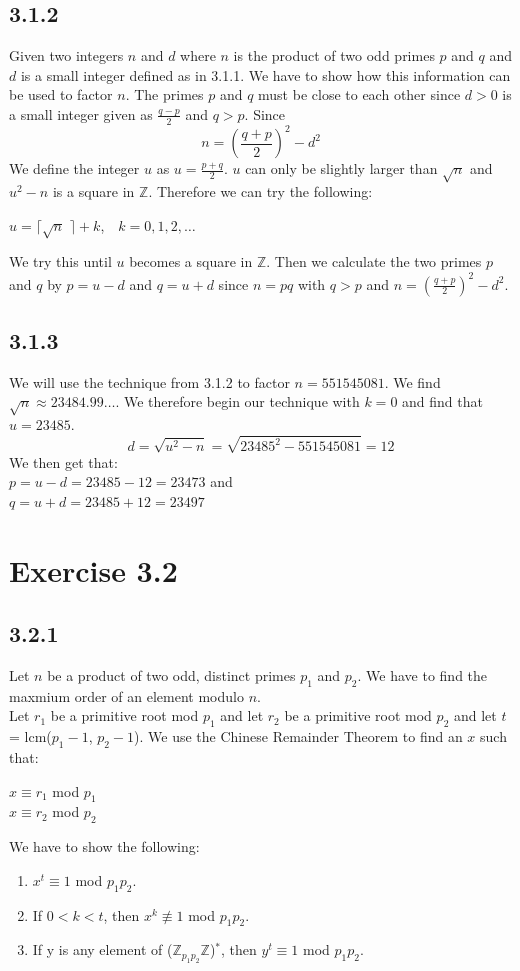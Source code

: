 \documentclass[11pt]{report}
\begin{document}
\subsection*{3.1.2}
Given two integers $n$ and $d$ where $n$ is the product of two odd primes $p$ and $q$ and $d$ is a small integer defined as in 3.1.1. We have to show how this information can be used to factor $n$. The primes $p$ and $q$ must be close to each other since $d > 0$ is a small integer given as $\frac{q-p}{2}$ and $q > p$. Since
$$n = (\frac{q + p}{2})^2 - d^2$$
We define the integer $u$ as $u = \frac{p+q}{2}$. $u$ can only be slightly larger than $\sqrt{n}$ and $u^2 - n$ is a square in $\mathbb{Z}$. Therefore we can try the following:
\begin{center}
$u = \lceil \sqrt{n}$ $\rceil + k$, ${}$ ${}$ $k =0,1,2,\dots$
\end{center}
We try this until $u$ becomes a square in $\mathbb{Z}$. Then we calculate the two primes $p$ and $q$ by $p = u - d$ and $q = u + d$ since $n = pq$ with $q > p$ and $n = (\frac{q + p}{2})^2 - d^2$.


\subsection*{3.1.3}
We will use the technique from 3.1.2 to factor $n = 551545081$. We find $\sqrt{n} \approx 23484.99\dots$. We therefore begin our technique with $k = 0$ and find that $u = 23485$.
$$d = \sqrt{u^2 - n} = \sqrt{23485^2 - 551545081} = 12$$
We then get that:\\
$p = u - d = 23485 - 12 = 23473$ and\\
$q = u + d = 23485 + 12 = 23497$\\

\section*{Exercise 3.2}
\subsection*{3.2.1}
Let $n$ be a product of two odd, distinct primes $p_1$ and $p_2$. We have to find the maxmium order of an element modulo $n$.\\
Let $r_1$ be a primitive root mod $p_1$ and let $r_2$ be a primitive root mod $p_2$ and let $t$ = lcm($p_1 -1$, $p_2 - 1$). We use the Chinese Remainder Theorem to find an $x$ such that:
\begin{center}
$x \equiv r_1$ mod $p_1$\\
$x \equiv r_2$ mod $p_2$
\end{center}
We have to show the following:
\begin{enumerate}
\item $x^t \equiv 1$ mod $p_1p_2$.
\item If $0 < k < t$, then $x^k \not\equiv 1$ mod $p_1p_2$.
\item If y is any element of ($\mathbb{Z}_{p_1p_2}\mathbb{Z}$)$^*$, then $y^t \equiv 1$ mod $p_1p_2$.
\end{enumerate}
\end{document}
